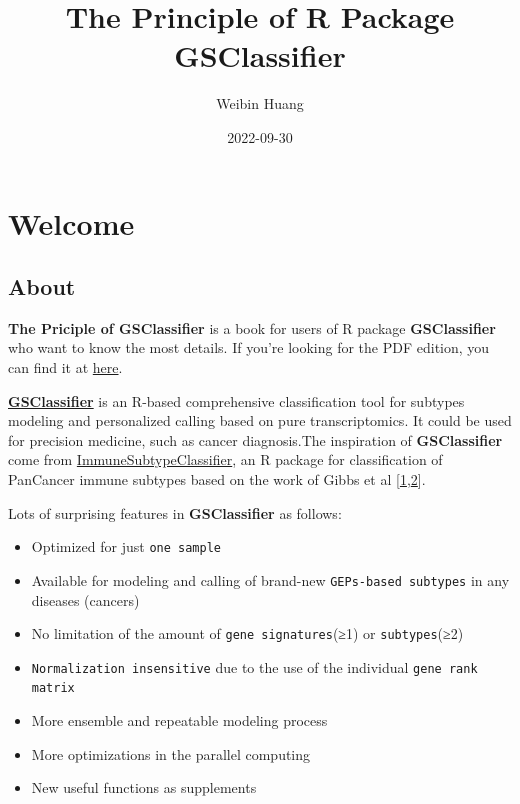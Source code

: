 \documentclass[
  12pt,
]{book}
\title{The Principle of R Package GSClassifier}
\author{Weibin Huang}
\date{2022-09-30}
\newcommand{\passthrough}[1]{#1}
\begin{document}
\maketitle

{
\hypersetup{linkcolor=}
\setcounter{tocdepth}{2}
\tableofcontents
}
\hypertarget{welcome}{%
\chapter*{Welcome}\label{welcome}}

\hypertarget{about}{%
\section*{About}\label{about}}

\textbf{The Priciple of GSClassifier} is a book for users of R package \textbf{GSClassifier} who want to know the most details. If you're looking for the PDF edition, you can find it at \href{https://github.com/huangwb8/GSClassifier.principle/blob/master/docs/GSClassifier.principle.pdf}{here}.

\href{https://github.com/huangwb8/GSClassifier}{\textbf{GSClassifier}} is an R-based comprehensive classification tool for subtypes modeling and personalized calling based on pure transcriptomics. It could be used for precision medicine, such as cancer diagnosis.The inspiration of \textbf{GSClassifier} come from \href{https://github.com/CRI-iAtlas/ImmuneSubtypeClassifier}{ImmuneSubtypeClassifier}, an R package for classification of PanCancer immune subtypes based on the work of Gibbs et al {[}\protect\hyperlink{ref-RN160}{1},\protect\hyperlink{ref-RN315}{2}{]}.

Lots of surprising features in \textbf{GSClassifier} as follows:

\begin{itemize}
\item
  Optimized for just \passthrough{\lstinline!one sample!}
\item
  Available for modeling and calling of brand-new \passthrough{\lstinline!GEPs-based subtypes!} in any diseases (cancers)
\item
  No limitation of the amount of \passthrough{\lstinline!gene signatures!}(≥1) or \passthrough{\lstinline!subtypes!}(≥2)
\item
  \passthrough{\lstinline!Normalization insensitive!} due to the use of the individual \passthrough{\lstinline!gene rank matrix!}
\item
  More ensemble and repeatable modeling process
\item
  More optimizations in the parallel computing
\item
  New useful functions as supplements
\end{itemize}
\end{document}
